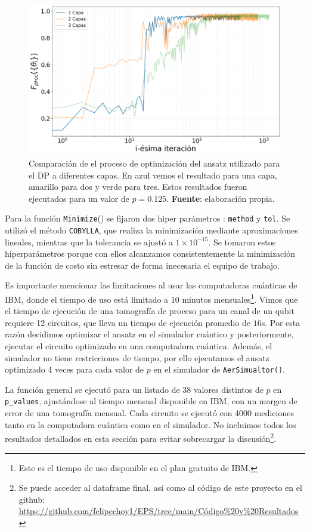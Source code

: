 \documentclass[letterpaper,12pt]{thesisECFM}
\theoremstyle{plain}
\theoremstyle{definition}
\theoremstyle{definition}
\theoremstyle{remark}
\newcommand{\1}{\mathbb{1}}
\begin{document}
\begin{figure}[h!]  %
    \centering 
    \includegraphics[width=0.70 \linewidth]{imagenes/comparacion_capas.png}
    \caption{Comparación de el proceso de optimización del ansatz utilizado
para el DP a diferentes capas. En azul vemos el resultado para una capa,
amarillo para dos y verde para tres. Estos resultados fueron ejecutados para un
valor de $p=0.125$. \textbf{Fuente}: elaboración propia.}
    \label{fig:comparacion_capas}
\end{figure} %


Para la función \texttt{Minimize}() se fijaron dos hiper parámetros :
\texttt{method} y \texttt{tol}. Se utilizó el método \texttt{COBYLLA}, que
realiza la minimización mediante aproximaciones lineales, mientras que la
tolerancia se ajustó a $1\times 10^{-15}$. Se tomaron estos hiperparámetros
porque con ellos alcanzamos consistentemente la minimización de la función de
costo sin estresar de forma inecesaria el equipo de trabajo. 

Es importante mencionar las limitaciones al usar las computadoras cuánticas de
IBM, donde el tiempo de uso está limitado a 10 minutos mensuales\footnote{Este
es el tiempo de uso disponible en el plan gratuito de IBM.}. Vimos que el
tiempo de ejecución de una tomografía de proceso para un canal de un  qubit
requiere 12 circuitos, que lleva un tiempo de ejecución promedio de $16$s. Por
esta razón decidimos optimizar el ansatz en el simulador cuántico y
posteriormente, ejecutar el circuito optimizado en una computadora cuántica.
Además, el simulador no tiene restricciones de tiempo, por ello ejecutamos el
ansatz optimizado 4 veces para cada valor de $p$ en el simulador de
\texttt{AerSimualtor()}.

La función general se ejecutó para un listado de 38 valores distintos de $p$ en 
\texttt{p\_values}, ajustándose al tiempo mensual disponible en IBM, con un 
margen de error de una tomografía mensual. Cada circuito se ejecutó con 4000 
mediciones tanto en la computadora cuántica como en el simulador.  No incluimos 
todos los resultados detallados en esta sección para evitar sobrecargar la 
discusión\footnote{Se puede acceder al dataframe final, así como al código de 
este proyecto en el github: 
\href{https://github.com/felipechoy1/EPS/tree/main/Código\%20y\%20Resultados}{https://github.com/felipechoy1/EPS/tree/main/Código\%20y\%20Resultados}}.
\end{document}
